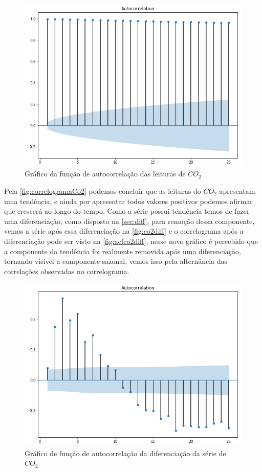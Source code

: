 \documentclass[
    12pt,
    oneside,
    a4paper,
    english,
    brazil
]{abntex2}
\begin{document}
\begin{figure}[ht]
    \centering
    \caption{Gráfico da função de autocorrelação das leituras de
        $CO_2$}\label{fig:correlogramaCo2}
    \includegraphics[width=.5\linewidth]{images/acf_co2.png}
\end{figure}

Pela \autoref{fig:correlogramaCo2}  podemos concluir que as  leituras do $CO_2$
apresentam  uma  tendência, e  ainda  por  apresentar todos  valores  positivos
podemos afirmar que  crescerá ao longo do tempo. Como  a série possui tendência
temos  de  fazer  uma   diferenciação,  como  disposto  na  \autoref{sec:diff},
para  remoção  dessa componente,  vemos  a  série  após essa  diferenciação  na
\autoref{fig:co2diff} e o  correlograma após a diferenciação pode  ser visto na
\autoref{fig:acfco2diff}, nesse  novo gráfico é  percebido que a  componente da
tendência foi  realmente removida  após uma  diferenciação, tornando  visível a
componente sazonal, vemos  isso pela alternância das  correlações observadas no
correlograma.

\begin{figure}[ht]
    \centering
    \caption{Gráfico de função de autocorrelação da diferenciação da série de
        $CO_2$}\label{fig:acfco2diff}
    \includegraphics[width=.5\linewidth]{images/acf_co2_diff.png}
\end{figure}
\end{document}
